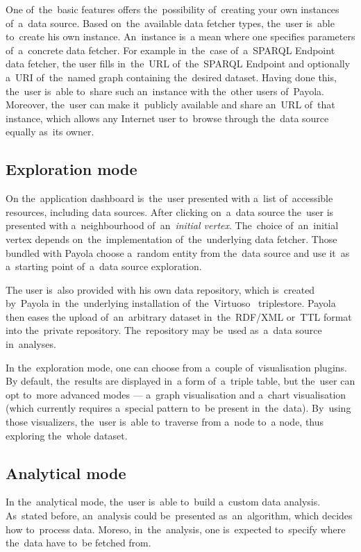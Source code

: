 One of~the~basic features offers the~possibility of~creating your own instances of~a~data source. Based on~the~available data fetcher types, the~user is~able to~create 
his own instance. An~instance is~a mean where one specifies parameters of~a~concrete data fetcher. For example in~the~case of~a~SPARQL Endpoint data fetcher,
the user fills in~the~URL of~the~SPARQL Endpoint and optionally a~URI of~the~named graph 
containing the~desired dataset. Having done this, the~user is~able to~share 
such an~instance with the~other users of~Payola.
Moreover, the~user can make it~publicly available and share an~URL of~that instance, which allows any 
Internet user to~browse through the~data source equally as~its owner.

\subsection{Exploration mode}
On the~application dashboard is~the~user presented with a~list of~accessible 
resources, including data sources. After clicking on~a~data source the~user is
presented with a~neighbourhood of~an~\emph{initial vertex}. The~choice of~an~initial vertex
depends on~the~implementation of~the~underlying data fetcher.
Those bundled with Payola choose a~random entity from the~data source
and use it~as a~starting point of~a~data source exploration.

The user is~also provided with his own data repository, which is~created by~Payola in~the~underlying installation of~the~Virtuoso~\cite{virtuoso} triplestore. Payola then eases 
the upload of~an~arbitrary dataset in~the~RDF/XML or~TTL 
format into the~private repository. The~repository may be~used as~a~data source in~analyses.

In the~exploration mode, one can choose from a~couple of~visualisation plugins. 
By default, the~results are displayed in~a form of~a~triple table, but the~user can 
opt to~more advanced modes --- a~graph visualisation and a~chart visualisation
(which currently requires a~special pattern to~be present in~the~data). By~using those 
visualizers, the~user is~able to~traverse from a~node to~a node, thus exploring the~whole 
dataset.

\subsection{Analytical mode}
In the~analytical mode, the~user is~able to~build a~custom data analysis. As~stated before, an~analysis could be~presented as~an~algorithm, which decides 
how to~process data. Moreso, in~the~analysis, one is~expected to~specify 
where the~data have to~be fetched from.

